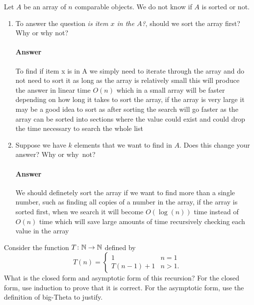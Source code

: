\documentclass{article}
\begin{document}
\collab{\todo{}}
Let $A$ be an array of $n$ comparable objects.  We do not know if $A$ is sorted
or not.

\begin{enumerate}
	\item To answer the question \emph{is item $x$ in the $A$?}, should we
	      sort the array first?  Why or why not?

	      \paragraph{Answer}

To find if item x is in A we simply need to iterate through the array and do not need to sort it as long as the array is relatively small
this will produce the answer in linear time $O(n)$ which in a small array will be faster depending on how long it takes to sort the array, if the array
is very large it may be a good idea to sort as after sorting the search will go faster as the array can be sorted into sections where the value could exist and
could drop the time necessary to search the whole list

	\item Suppose we have $k$ elements that we want to find in $A$. Does this
	      change your answer? Why or why~not?

	      \paragraph{Answer}

We should definetely sort the array if we want to find more than a single number, such as finding all copies of a number in the array,
if the array is sorted first, when we search it will become $O(\log(n))$ time instead of $O(n)$ time which will save large amounts of time recursively
checking each value in the array

\end{enumerate}

\collab{\todo{}}
Consider the function $T \colon {\mathbb N} \to {\mathbb N}$ defined by
\[T (n) = \begin{cases}
		1        & n=1  \\
		T(n-1)+1 & n>1.
	\end{cases}
\]
What is the closed form and asymptotic form of this recursion?  For the
closed form, use induction to prove that it is correct.  For the asymptotic
form, use the definition of big-Theta to justify.
\end{document}
